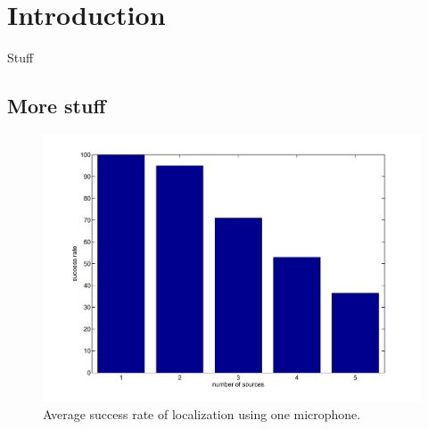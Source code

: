 \section{Introduction}
Stuff \cite{fuchs2011}
\subsection{More stuff}
\begin{figure}[htb]%
\centering
\includegraphics[width=0.8\columnwidth]{images/success_one_mic.pdf}%
\caption{Average success rate of localization using one microphone.}%
\label{onemicgauss}%
\end{figure}